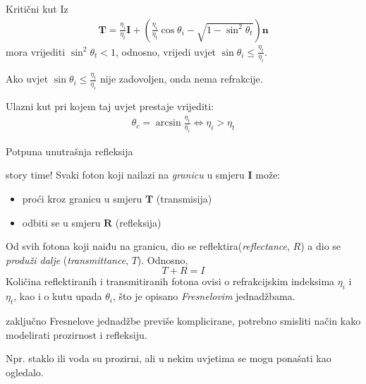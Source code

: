 \documentclass[9pt]{beamer}
\begin{document}
\begin{frame}{Kritični kut}
	Iz \begin{align*}
	\mathbf{T} = \frac{\eta_i}{\eta_t}\mathbf{I} + \left(\frac{\eta_i}{\eta_t} \cos \theta_i - \sqrt{1- \sin^2 \theta_t}\right)\mathbf{n}
	\end{align*}
	mora vrijediti $\sin^2 \theta_t < 1$, odnosno, vrijedi uvjet $\sin \theta_i \leq \frac{\eta_t}{\eta_i}$.
	
	\begin{block}{}
		Ako uvjet $\sin \theta_i \leq \frac{\eta_t}{\eta_i}$ \alert{nije} zadovoljen, onda nema \alert{refrakcije}.
		
		Ulazni kut pri kojem taj uvjet prestaje vrijediti: 
		\begin{align*}
			\theta_c = \arcsin \frac{\eta_t}{\eta_i} \Leftrightarrow \eta_i > \eta_t
		\end{align*}
	\end{block}
\end{frame}

\begin{frame}{Potpuna unutrašnja refleksija}
	\begin{block}{story time!}
		Svaki foton koji nailazi na \textit{granicu} u smjeru $\mathbf{I}$ može:
		\begin{itemize}
			\item proći kroz granicu u smjeru $\mathbf{T}$ (transmisija)
			\item odbiti se u smjeru  $\mathbf{R}$ (refleksija)
		\end{itemize}
		Od svih fotona koji naiđu na granicu, dio se reflektira(\textit{reflectance}, $R$) a dio se \textit{produži dalje} (\textit{transmittance}, $T$). Odnosno,
		$$T + R = I$$
		Količina reflektiranih i transmitiranih fotona ovisi o refrakcijskim indeksima $\eta_i$ i $\eta_t$, kao i o kutu
		upada $\theta_i$, što je opisano \textit{Fresnelovim} jednadžbama.
	\end{block}
	\begin{block}{zaključno}
		Fresnelove jednadžbe previše komplicirane, potrebno smisliti način kako modelirati prozirnost i refleksiju.
		
		Npr. staklo ili voda su prozirni, ali u nekim uvjetima se mogu ponašati kao ogledalo.
	\end{block}
\end{frame}
\end{document}

